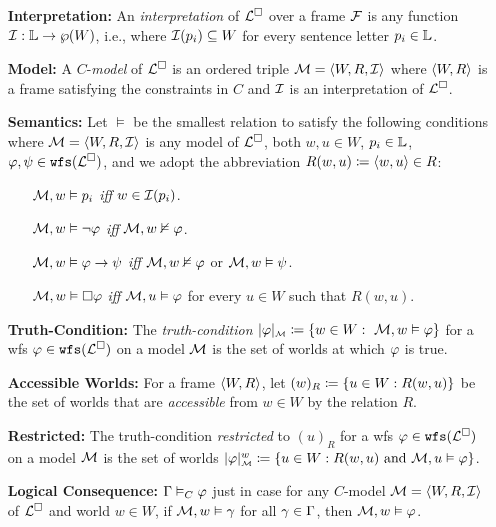 \documentclass[a4paper, 11pt]{article} %
\begin{document}
\begin{enumerate}[leftmargin=1.2in] %
  \item[\bf Interpretation:] An \textit{interpretation} of $\ML$ over a frame $\F$ is any function $\I : \SL \to \wp(W)$, i.e., where $\I(p_i) \subseteq W$ for every sentence letter $p_i \in \SL$.
	\item[\bf Model:] A $C$-\textit{model} of $\ML$ is an ordered triple $\M = \tuple{W, R, \I}$ where $\tuple{W, R}$ is a frame satisfying the constraints in $C$ and $\I$ is an interpretation of $\ML$.
  \item[\bf Semantics:] Let $\vDash$ be the smallest relation to satisfy the following conditions where $\M = \tuple{W, R, \I}$ is any model of $\ML$, both $w, u \in W$, $p_i \in \SL$, $\metaA, \metaB \in \wfs{\ML}$, and we adopt the abbreviation $R(w,u) \coloneq \tuple{w, u} \in R$:
    \begin{itemize}[leftmargin=.15in]\small
      \item[] $\M, w\vDash  p_i$ \textit{iff} $w \in \I(p_i)$.
      \item[] $\M, w\vDash  \neg \metaA$ \textit{iff} $\M, w\nvDash \metaA$.
      \item[] $\M, w\vDash  \metaA\rightarrow \metaB$ \textit{iff} $\M, w\nvDash \metaA$ or $\M, w\vDash  \metaB$.
      \item[] $\M, w\vDash  \Box \metaA$ \textit{iff} $\M, u\vDash \metaA$ for every $u \in W$ such that $R(w,u)$.
    \end{itemize}
  \item[\bf Truth-Condition:] The \textit{truth-condition} $\interpret{\M}{\metaA} \coloneq \set{w\in W: ~\M, w\vDash  \metaA}$ for a wfs $\metaA \in \wfs{\ML}$ on a model $\M$ is the set of worlds at which $\metaA$ is true.
  \item[\bf Accessible Worlds:] For a frame $\tuple{W, R}$, let $(w)_R \coloneq \set{u \in W : R(w,u)}$ be the set of worlds that are \textit{accessible} from $w \in W$ by the relation $R$.
  \item[\bf Restricted:] The truth-condition \textit{restricted} to $(u)_R$ for a wfs $\metaA \in \wfs{\ML}$ on a model $\M$ is the set of worlds $\interpret{\M}{\metaA}^w \coloneq \set{u\in W : R(w, u) \text{ and } \M, u\vDash  \metaA}$.
  \item[\bf Logical Consequence:] $\MetaG \MLmodels[C] \metaA$ just in case for any $C$-model $\M = \tuple{W, R, \I}$ of $\ML$ and world $w \in W$, if $\M, w \vDash \metaG$ for all $\metaG \in \MetaG$, then $\M, w \vDash \metaA$.

\end{enumerate}
\end{document}
